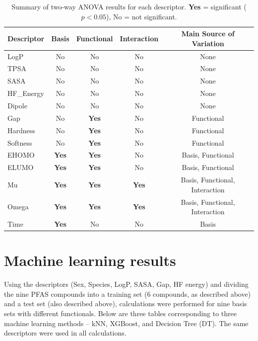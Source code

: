 \begin{table}[h!]
\centering
\caption{Summary of two-way ANOVA results for each descriptor. \textbf{Yes} = significant ($p < 0.05$), No = not significant.}
\begin{tabular}{lcccc}
\hline
\textbf{Descriptor} & \textbf{Basis} & \textbf{Functional} & \textbf{Interaction} & \textbf{Main Source of Variation} \\
\hline
LogP         & No  & No  & No  & None \\
TPSA         & No  & No  & No  & None \\
SASA         & No  & No  & No  & None \\
HF\_Energy   & No  & No  & No  & None \\
Dipole       & No  & No  & No  & None \\
Gap          & No  & \textbf{Yes} & No  & Functional \\
Hardness     & No  & \textbf{Yes} & No  & Functional \\
Softness     & No  & \textbf{Yes} & No  & Functional \\
EHOMO        & \textbf{Yes} & \textbf{Yes} & No  & Basis, Functional \\
ELUMO        & \textbf{Yes} & \textbf{Yes} & No  & Basis, Functional \\
Mu           & \textbf{Yes} & \textbf{Yes} & \textbf{Yes} & Basis, Functional, Interaction \\
Omega        & \textbf{Yes} & \textbf{Yes} & \textbf{Yes} & Basis, Functional, Interaction \\
Time         & \textbf{Yes} & No & No & Basis \\
\hline
\end{tabular}
\label{tab:anova-summary}
\end{table}



\clearpage
\section{Machine learning results}
   

Using the descriptors (Sex, Species, LogP, SASA, Gap, HF energy) and dividing the nine PFAS compounds into a training set (6 compounds, as described above) and a test set (also described above), calculations were performed for nine basis sets with different functionals. Below are three tables corresponding to three machine learning methods – kNN, XGBoost, and Decision Tree (DT). The same descriptors were used in all calculations.

